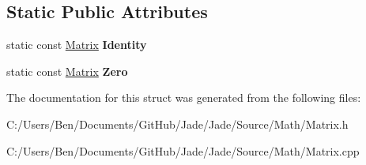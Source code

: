 \subsection*{Static Public Attributes}
\begin{DoxyCompactItemize}
\item 
\hypertarget{struct_jade_1_1_math_1_1_matrix_a89bfcd378ee8aeba30f393a9bc431e49}{}static const \hyperlink{struct_jade_1_1_math_1_1_matrix}{Matrix} {\bfseries Identity}\label{struct_jade_1_1_math_1_1_matrix_a89bfcd378ee8aeba30f393a9bc431e49}

\item 
\hypertarget{struct_jade_1_1_math_1_1_matrix_a32ed6952707144091d2bee00c0af4cc4}{}static const \hyperlink{struct_jade_1_1_math_1_1_matrix}{Matrix} {\bfseries Zero}\label{struct_jade_1_1_math_1_1_matrix_a32ed6952707144091d2bee00c0af4cc4}

\end{DoxyCompactItemize}


The documentation for this struct was generated from the following files\+:\begin{DoxyCompactItemize}
\item 
C\+:/\+Users/\+Ben/\+Documents/\+Git\+Hub/\+Jade/\+Jade/\+Source/\+Math/Matrix.\+h\item 
C\+:/\+Users/\+Ben/\+Documents/\+Git\+Hub/\+Jade/\+Jade/\+Source/\+Math/Matrix.\+cpp\end{DoxyCompactItemize}
